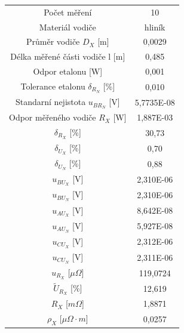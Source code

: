 \documentclass[a4paper, czech]{article}
\begin{document}
\begin{table}[H]
    \begin{tabular}{cc}
        \hline
        \cellcolor{lightgray}    Počet měření                     & \cellcolor{blue!30} 10         \\
        \cellcolor{lightgray} Materiál vodiče                       & \cellcolor{blue!30} hliník     \\
        \cellcolor{lightgray} Průměr vodiče $D_X$ {[}m{]}              & \cellcolor{blue!30} 0,0029     \\
        \cellcolor{lightgray} Délka měřené části vodiče l {[}m{]}   & \cellcolor{blue!30} 0,485      \\
        \cellcolor{lightgray} Odpor etalonu {[}W{]}                 & \cellcolor{blue!30} 0,001      \\
        \cellcolor{lightgray} Tolerance etalonu $\delta_{R_N}$ {[}\%{]}        & \cellcolor{blue!30} 0,010      \\
        Standarní nejistota $u_{BR_N}$ {[}V{]}      & 5,7735E-08 \\
        Odpor měřeného vodiče $R_X$ {[}W{]}      & 1,887E-03        \\
        $\delta_{R_X}$ {[}\%{]}                          & 30,73        \\
        $\delta_{U_X}$ {[}\%{]}                          & 0,70        \\
        $\delta_{U_N}$ {[}\%{]}                          & 0,88        \\
        $u_{BU_X}$ {[}V{]}                          & 2,310E-06        \\
        $u_{BU_N}$ {[}V{]}                          & 2,310E-06        \\
        $u_{AU_X}$ {[}V{]}                          & 8,642E-08        \\
        $u_{AU_N}$ {[}V{]}                          & 5,927E-08        \\
        $u_{CU_X}$ {[}V{]}                          & 2,312E-06        \\
        $u_{CU_N}$ {[}V{]}                          & 2,311E-06        \\
        \cellcolor{lightgray} $u_{R_X}$ [$\mu \Omega$]                          & \cellcolor{blue!30} 119,0724     \\
        \cellcolor{lightgray} $\tilde{U}_{R_X}$ [\%]                     & \cellcolor{blue!30} 12,619         \\
        \cellcolor{lightgray} $R_X$ [$m \Omega$]                  & \cellcolor{blue!30} 1,8871            \\
        \cellcolor{lightgray} $\rho_X$ [$\mu \Omega \cdot m$]                       & \cellcolor{blue!30} 0,0257    \\
        \hline
    \end{tabular}
\end{table}
\end{document}

